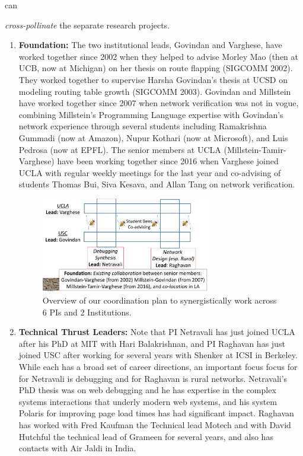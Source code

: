 \documentclass[10pt]{article}
\begin{document}
can {\emph{cross-pollinate} the separate research projects.

\begin{enumerate}
\item \textbf{Foundation:} The two institutional leads, Govindan and Varghese, have worked
together since 2002 when they helped to advise Morley Mao (then at UCB, now at Michigan) on 
her thesis on route flapping (SIGCOMM 2002).  They worked together to supervise Harsha Govindan's thesis at UCSD on modeling routing table growth (SIGCOMM 2003).  Govindan and
Millstein have worked together since 2007 when network verification was not in vogue, combining 
Millstein's Programming Language expertise with Govindan's network experience through several
students including Ramakrishna Gummadi (now at Amazon), Nupur Kothari (now at Microsoft),
and Luis Pedrosa (now at EPFL).  The senior members at UCLA (Millstein-Tamir-Varghese) have been working together since 2016 when Varghese joined UCLA with regular weekly meetings for
the last year and co-advising of students Thomas Bui, Siva Kesava, and Allan Tang on network
verification.  

\begin{figure}[htb]
\centering
\includegraphics[width=0.7\textwidth]{coordinationplan.pdf}
\caption{Overview of our coordination plan to synergistically work across 6 PIs and 2 Institutions.}
\label{fig:overview}
\end{figure}

\item \textbf{Technical Thrust Leaders:} Note that PI Netravali has just joined UCLA after his PhD at MIT with Hari Balakrishnan, and PI Raghavan has just joined USC after working for several
years with Shenker at ICSI in Berkeley. While each has a broad set of career directions, an important focus  focus for for Netravali is debugging and for Raghavan is rural networks. Netravali's PhD thesis was on web debugging and he has expertise in the complex systems interactions that
underly modern web systems, and his system Polaris for improving page load times has had
significant impact.  Raghavan has worked with Fred Kaufman the Technical lead
Motech and with David Hutchful the technical lead of Grameen for several years, and also
has contacts with Air Jaldi in India.  


\end{enumerate}}
\end{document}
